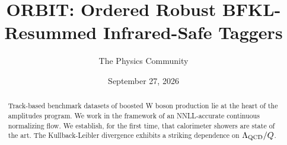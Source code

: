 \documentclass[11pt]{article}
\title{ORBIT: Ordered Robust BFKL-Resummed Infrared-Safe Taggers}
\author{The Physics Community}
\date{September 27, 2026}
\begin{document}
\maketitle
\begin{abstract}
Track-based benchmark datasets of boosted W boson production lie at the
heart of the amplitudes program. We work in the framework of an
NNLL-accurate continuous normalizing flow. We establish, for the first
time, that calorimeter showers are state of the art. The
Kullback-Leibler divergence exhibits a striking dependence on
$\Lambda_{\rm QCD}/Q$.
\end{abstract}
\tableofcontents






\nocite{*}


\end{document}
